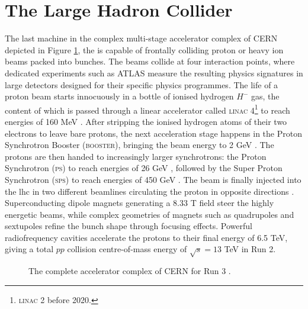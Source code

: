 \section{The Large Hadron Collider}\label{sec-LHC}
The last machine in the complex multi-stage accelerator complex of CERN depicted in Figure \ref{fig-CernAccSys}, the  is capable of frontally colliding proton or heavy ion beams packed into bunches. The beams collide at four interaction points, where dedicated experiments such as ATLAS measure the resulting physics signatures in large detectors designed for their specific physics programmes. The life of a proton beam starts innocuously in a bottle of ionised hydrogen $H^-$ gas, the content of which is passed through a linear accelerator called \textsc{linac} 4\footnote{\textsc{linac} 2 before 2020.} to reach energies of 160 MeV \cite{Vretenar:2020quc}. After stripping the ionised hydrogen atoms of their two electrons to leave bare protons, the next acceleration stage happens in the Proton Synchrotron Booster (\textsc{booster}), bringing the beam energy to 2 GeV \cite{Reich:1969fw}. The protons are then handed to increasingly larger synchrotrons: the Proton Synchrotron (\textsc{ps}) to reach energies of 26 GeV \cite{CERNPS}, followed by the Super Proton Synchrotron (\textsc{sps}) to reach energies of 450 GeV \cite{Synchrotron:1997188}. The beam is finally injected into the \gls{lhc} in two different beamlines circulating the proton in opposite directions \cite{Evans:2008zzb}. Superconducting dipole magnets generating a 8.33 T field steer the highly energetic beams, while complex geometries of magnets such as quadrupoles and sextupoles refine the bunch shape through focusing effects. Powerful radiofrequency cavities accelerate the protons to their final energy of 6.5 TeV, giving a total $pp$ collision centre-of-mass energy of $\sqrt{s} = 13$ TeV in Run 2. 

\begin{figure}[!h]
  \centering
  \caption{The complete accelerator complex of CERN for Run 3 \cite{CERNAcc}.}
  \label{fig-CernAccSys}
\end{figure}

